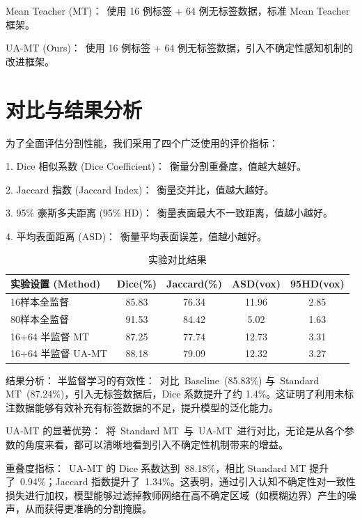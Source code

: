 \documentclass[twoside,openright]{xduugthesis}
\begin{document}
Mean Teacher (MT)： 使用 16 例标签 + 64 例无标签数据，标准 Mean Teacher 框架。

UA-MT (Ours)： 使用 16 例标签 + 64 例无标签数据，引入不确定性感知机制的改进框架。

\section{对比与结果分析}
为了全面评估分割性能，我们采用了四个广泛使用的评价指标：

1. Dice 相似系数 (Dice Coefficient)： 衡量分割重叠度，值越大越好。

2. Jaccard 指数 (Jaccard Index)： 衡量交并比，值越大越好。

3. 95\% 豪斯多夫距离 (95\% HD)： 衡量表面最大不一致距离，值越小越好。

4. 平均表面距离 (ASD)： 衡量平均表面误差，值越小越好。

\begin{table}[htbp]
  \centering
  \caption{实验对比结果}
  \label{tab:exp_results_fullborder}
  \begin{tabular}{|l|c|c|c|c|}
    \hline %
    \textbf{实验设置 (Method)} & \textbf{Dice(\%)} & \textbf{Jaccard(\%)} & \textbf{ASD(vox)} & \textbf{95HD(vox)} \\
    \hline %
    16样本全监督 & 85.83 & 76.34 & 11.96 & 2.85 \\
    \hline %
    80样本全监督 & 91.53 & 84.42 & 5.02 & 1.63 \\
    \hline %
    16+64 半监督 MT & 87.25 & 77.74 & 12.73 & 3.31 \\
    \hline %
    16+64 半监督 UA-MT & 88.18 & 79.09 & 12.32 & 3.27 \\
    \hline %
  \end{tabular}
\end{table}

结果分析：
半监督学习的有效性： 对比 Baseline (85.83\%) 与 Standard MT (87.24\%)，引入无标签数据后，Dice 系数提升了约 1.4\%。这证明了利用未标注数据能够有效补充有标签数据的不足，提升模型的泛化能力。

UA-MT 的显著优势： 将 Standard MT 与 UA-MT 进行对比，无论是从各个参数的角度来看，都可以清晰地看到引入不确定性机制带来的增益。

重叠度指标： UA-MT 的 Dice 系数达到 88.18\%，相比 Standard MT 提升了 0.94\%；Jaccard 指数提升了 1.34\%。这表明，通过引入认知不确定性对一致性损失进行加权，模型能够过滤掉教师网络在高不确定区域（如模糊边界）产生的噪声，从而获得更准确的分割掩膜。
\end{document}
